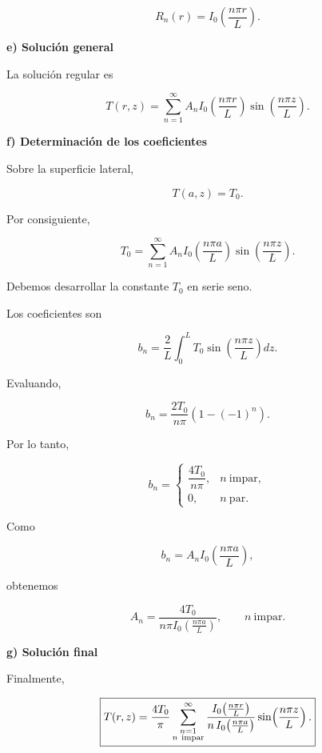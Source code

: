 \documentclass[11pt,spanish]{article}
\begin{document}
\[
R_n(r)
=
I_0\!\left(\frac{n\pi r}{L}\right).
\]


{\bf e) Solución general}

La solución regular es

\[
T(r,z)
=
\sum_{n=1}^{\infty}
A_n
I_0\!\left(\frac{n\pi r}{L}\right)
\sin\!\left(\frac{n\pi z}{L}\right).
\]


{\bf f) Determinación de los coeficientes}

Sobre la superficie lateral,

\[
T(a,z)=T_0.
\]

Por consiguiente,

\[
T_0
=
\sum_{n=1}^{\infty}
A_n
I_0\!\left(\frac{n\pi a}{L}\right)
\sin\!\left(\frac{n\pi z}{L}\right).
\]

Debemos desarrollar la constante \(T_0\) en serie seno.

Los coeficientes son

\[
b_n
=
\frac{2}{L}
\int_0^L
T_0
\sin\!\left(\frac{n\pi z}{L}\right)
dz.
\]

Evaluando,

\[
b_n
=
\frac{2T_0}{n\pi}
\left(1-(-1)^n\right).
\]

Por lo tanto,

\[
b_n=
\begin{cases}
\dfrac{4T_0}{n\pi},
&
n\ \text{impar},
\\[2ex]
0,
&
n\ \text{par}.
\end{cases}
\]

Como

\[
b_n
=
A_n
I_0\!\left(\frac{n\pi a}{L}\right),
\]

obtenemos

\[
\boxed{
A_n
=
\frac{4T_0}
{n\pi
I_0\!\left(\frac{n\pi a}{L}\right)},
\qquad
n\ \text{impar}.
}
\]


{\bf g) Solución final}

Finalmente,

\[
\boxed{
T(r,z)
=
\frac{4T_0}{\pi}
\sum_{\substack{n=1\\ n\ {\rm impar}}}^{\infty}
\frac{
I_0\!\left(\frac{n\pi r}{L}\right)
}{
n\,
I_0\!\left(\frac{n\pi a}{L}\right)
}
\sin\!\left(\frac{n\pi z}{L}\right).
}
\]

\end{document}
